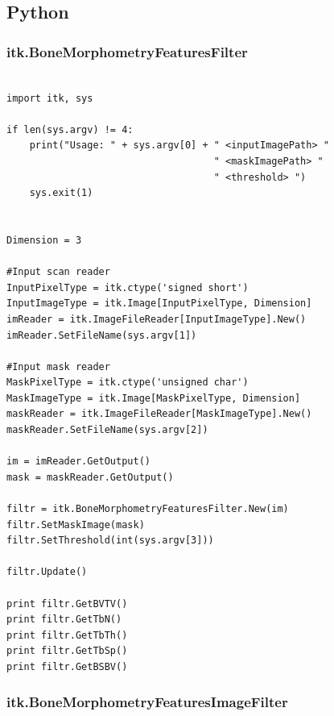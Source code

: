 \documentclass{InsightArticle}
\begin{document}
\subsection{Python}
\label{sec:pythonEx}

\subsubsection{itk.BoneMorphometryFeaturesFilter}

\begin{verbatim}

import itk, sys

if len(sys.argv) != 4:
    print("Usage: " + sys.argv[0] + " <inputImagePath> "
                                    " <maskImagePath> "
                                    " <threshold> ")
    sys.exit(1)


Dimension = 3

#Input scan reader
InputPixelType = itk.ctype('signed short')
InputImageType = itk.Image[InputPixelType, Dimension]
imReader = itk.ImageFileReader[InputImageType].New()
imReader.SetFileName(sys.argv[1])

#Input mask reader
MaskPixelType = itk.ctype('unsigned char')
MaskImageType = itk.Image[MaskPixelType, Dimension]
maskReader = itk.ImageFileReader[MaskImageType].New()
maskReader.SetFileName(sys.argv[2])

im = imReader.GetOutput()
mask = maskReader.GetOutput()

filtr = itk.BoneMorphometryFeaturesFilter.New(im)
filtr.SetMaskImage(mask)
filtr.SetThreshold(int(sys.argv[3]))

filtr.Update()

print filtr.GetBVTV()
print filtr.GetTbN()
print filtr.GetTbTh()
print filtr.GetTbSp()
print filtr.GetBSBV()

\end{verbatim}

\subsubsection{itk.BoneMorphometryFeaturesImageFilter}
\end{document}
